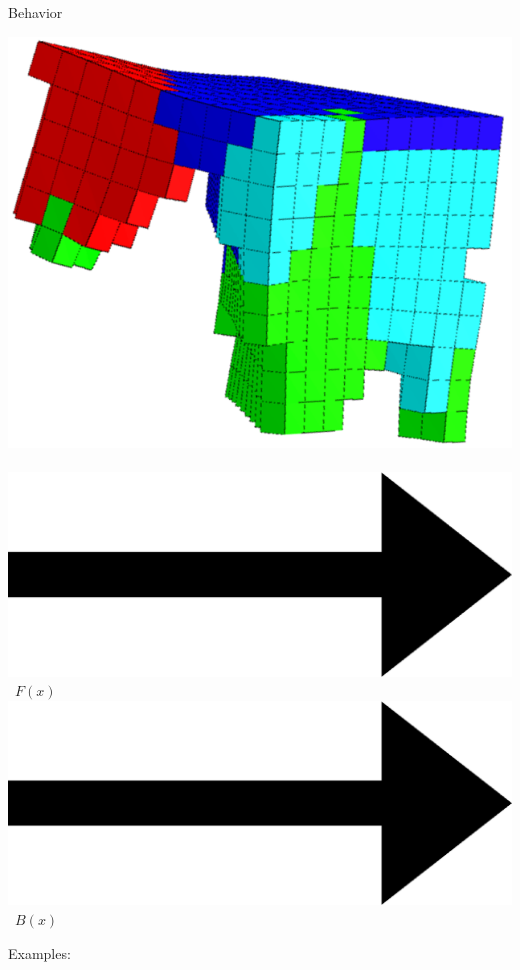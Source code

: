 \documentclass{beamer}
\begin{document}
\begin{frame}{Behavior}
\begin{center}
\includegraphics[height=0.15\textheight]{../Figures/Misc/unshacklingEvolutionFigure2.png}\	
\includegraphics[height=0.05\textheight]{../Figures/Misc/Arrow_east.eps}\	
{\huge $F(x)$ }\	
\includegraphics[height=0.05\textheight]{../Figures/Misc/Arrow_east.eps}\	
{\huge $B(x)$ }\\
\end{center}
\vspace{0.10cm}
Examples:\\
\begin{center}

\end{center}
\end{frame}
\end{document}
